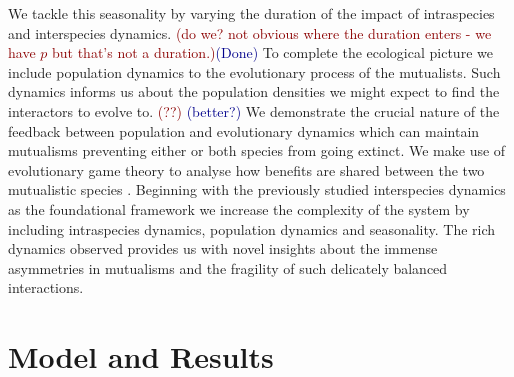 \documentclass[12pt]{article}
\newcommand{\cha}[1]{\textcolor{darkblue}{(#1)}}
\newcommand{\marcus}[1]{\textcolor{darkred}{(#1)}}
\begin{document}
We tackle this seasonality by varying the duration of the impact of intraspecies and interspecies dynamics.  \marcus{do we? not obvious where the duration enters - we have $p$ but that's not a duration.}\cha{Done}
To complete the ecological picture we include population dynamics to the evolutionary process of the mutualists.
Such dynamics informs us about the population densities we might expect to find the interactors to evolve to. \marcus{??} \cha{better?}
We demonstrate the crucial nature of the feedback between population and evolutionary dynamics which can maintain mutualisms preventing either or both species from going extinct. 
We make use of evolutionary game theory to analyse how benefits are shared between the two mutualistic species \citep{weibull:book:1995,hofbauer:JMB:1996,hofbauer:book:1998}.
Beginning with the previously studied interspecies dynamics as the foundational framework \citep{gokhale:PRSB:2012} we increase the complexity of the system by including intraspecies dynamics, population dynamics and seasonality.
The rich dynamics observed provides us with novel insights about the immense asymmetries in mutualisms and the fragility of such delicately balanced interactions.



\section{Model and Results}
\end{document}
